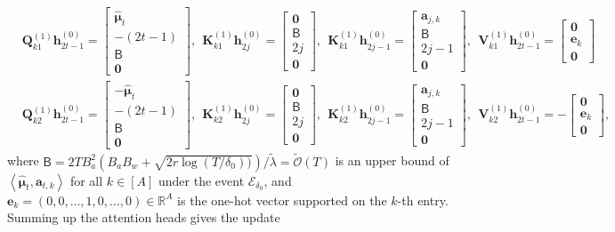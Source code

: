 \documentclass[10pt]{article}
\newcommand{\<}{\left\langle}
\renewcommand{\>}{\right\rangle}
\renewcommand{\bQ}{\mathbf{Q}}
\newcommand{\bzero}{{\mathbf 0}}
\newcommand{\R}{\mathbb{R}}
\newcommand{\Tpsmean}{{{\mathbf\mu}}}
\newcommand{\Tpsparn}{{r}}
\newcommand{\hpevent}{{\mathcal E}}
\newcommand{\tcO}{{\tilde{\mathcal O}}}
\newcommand{\tfthres}{{\mathsf{B}}}
\def\bK{{\mathbf K}}
\def\bQ{{\mathbf Q}}
\def\bV{{\mathbf V}}
\def\ba{{\mathbf a}}
\def\be{{\mathbf e}}
\def\bh{{\mathbf h}}
\begin{document}
\begin{align*}
    &\bQ_{k1}^{(1)}\bh^{(0)}_{2t-1}=\begin{bmatrix}
        \widehat\Tpsmean_t\\-(2t-1)\\ \tfthres \\\bzero
    \end{bmatrix},~~ \bK_{k1}^{(1)}\bh^{(0)}_{2j}=\begin{bmatrix}
     \bzero\\  \tfthres\\ 2j\\\bzero
\end{bmatrix},~~\bK_{k1}^{(1)}\bh^{(0)}_{2j-1}=\begin{bmatrix}
    \ba_{j,k}\\  \tfthres\\ 2j-1\\\bzero
\end{bmatrix},~~ \bV_{k1}^{(1)}\bh^{(0)}_{2t-1}=\begin{bmatrix}
        \bzero\\ \be_k \\ \bzero
    \end{bmatrix}
    \\
      &\bQ_{k2}^{(1)}\bh^{(0)}_{2t-1}=\begin{bmatrix}
        -\widehat\Tpsmean_t\\-(2t-1)\\ \tfthres \\\bzero
    \end{bmatrix},~~ \bK_{k2}^{(1)}\bh^{(0)}_{2j}=\begin{bmatrix}
     \bzero\\  \tfthres\\ 2j\\\bzero
\end{bmatrix},~~\bK_{k2}^{(1)}\bh^{(0)}_{2j-1}=\begin{bmatrix}
    \ba_{j,k}\\  \tfthres\\ 2j-1\\\bzero
\end{bmatrix},~~ \bV_{k2}^{(1)}\bh^{(0)}_{2t-1}=-\begin{bmatrix}
        \bzero\\ \be_k \\ \bzero
    \end{bmatrix},
\end{align*}
where $\tfthres=2TB_a^2(B_aB_w+\sqrt{2\Tpsparn\log(T/{\delta_0}))})/\tilde\lambda=\tcO(T)$ is an upper bound of $\<\widehat\Tpsmean_t,\ba_{t,k}\>$ for all $k\in[A]$ under the event $\hpevent_{{\delta_0}}$, and $\be_k=(0,0,\ldots,1,0,\ldots,0)\in\R^{A}$ is the one-hot vector supported on the $k$-th entry. Summing up the attention heads gives the update
\end{document}
